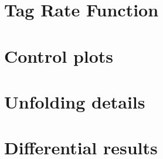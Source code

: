 \chapter{Tag Rate Function}
\label{app:trf}



\chapter{Control plots}
\label{app:selection}



\chapter{Unfolding details}
\label{app:unfolding}



\chapter{Differential results}
\label{app:correlations}


